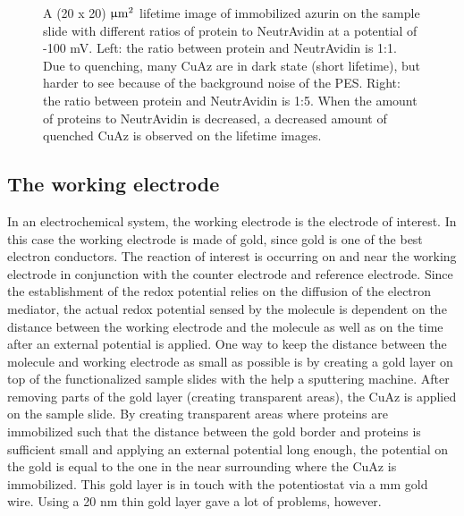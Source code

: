 \documentclass[twoside,single]{lion-msc}
\begin{document}
\begin{figure}
\begin{subfigure}{.5\textwidth}
  \label{}
\end{subfigure}
\caption{A (20 x 20) $\upmu \textup{m}^{2}$ lifetime image of immobilized azurin on the sample slide with different ratios of protein to NeutrAvidin at a potential of -100 mV. Left: the ratio between protein and NeutrAvidin is 1:1. Due to quenching, many CuAz are in dark state (short lifetime), but harder to see because of the background noise of the PES.  Right: the ratio between protein and NeutrAvidin is 1:5. When the amount of proteins to NeutrAvidin is decreased, a decreased amount of quenched CuAz is observed on the lifetime images.}
\label{finding_proteins}
\end{figure}


\subsection{The working electrode}
In an electrochemical system, the working electrode is the electrode of interest. In this case the working electrode is made of gold, since gold is one of the best electron conductors. The reaction of interest is occurring on and near the working electrode in conjunction with the counter electrode and reference electrode. Since the establishment of the redox potential relies on the diffusion of the electron mediator, the actual redox potential sensed by the molecule is dependent on the distance between the working electrode and the molecule as well as on the time after an external potential is applied. One way to keep the distance between the molecule and working electrode as small as possible is by creating a gold layer on top of the functionalized sample slides with the help a sputtering machine. After removing parts of the gold layer (creating transparent areas), the CuAz is applied on the sample slide. By creating transparent areas where proteins are immobilized such that the distance between the gold border and proteins is sufficient small and applying an external potential long enough, the potential on the gold is equal to the one in the near surrounding where the CuAz is immobilized. This gold layer is in touch with the potentiostat via a  mm gold wire. Using a 20 nm thin gold layer gave a lot of problems, however.
\end{document}
